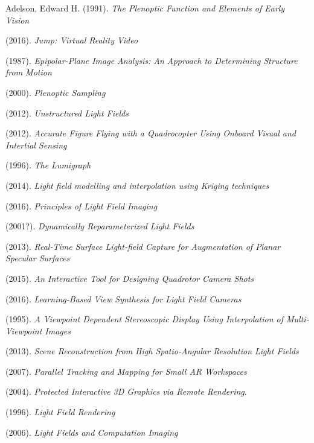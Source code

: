 \documentclass[12pt]{report}
\begin{document}
\begin{thebibliography}{10}%

	Adelson, Edward H. (1991). \emph{The Plenoptic Function and Elements of Early Vision}

	(2016). \emph{Jump: Virtual Reality Video}

	(1987). \emph{Epipolar-Plane Image Analysis: An Approach to Determining Structure from Motion}

	(2000). \emph{Plenoptic Sampling}

	(2012). \emph{Unstructured Light Fields}

	(2012). \emph{Accurate Figure Flying with a Quadrocopter Using Onboard Visual and Intertial Sensing}

	(1996). \emph{The Lumigraph}
	
	(2014). \emph{Light field modelling and interpolation using Kriging techniques}	
	
	(2016). \emph{Principles of Light Field Imaging}	
	
	(2001?). \emph{Dynamically Reparameterized Light Fields}

	(2013). \emph{Real-Time Surface Light-field Capture for Augmentation of Planar Specular Surfaces}
	
	(2015). \emph{An Interactive Tool for Designing Quadrotor Camera Shots}

	(2016). \emph{Learning-Based View Synthesis for Light Field Cameras}

	(1995). \emph{A Viewpoint Dependent Stereoscopic Display Using Interpolation of Multi-Viewpoint Images}
	
	(2013). \emph{Scene Reconstruction from High Spatio-Angular Resolution Light Fields}	
	
	(2007). \emph{Parallel Tracking and Mapping for Small AR Workspaces}	

	(2004). \emph{Protected Interactive 3D Graphics via Remote Rendering}.

	(1996). \emph{Light Field Rendering}
	
	(2006). \emph{Light Fields and Computation Imaging}


\end{thebibliography}
\end{document}
